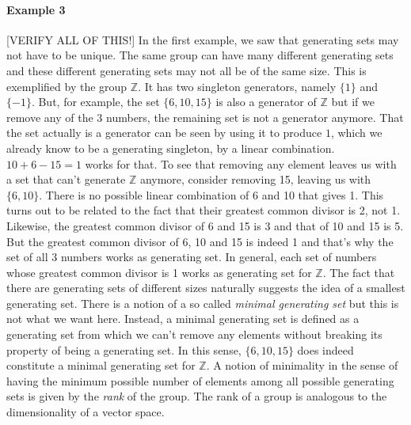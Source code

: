 \paragraph{Example 3} [VERIFY ALL OF THIS!] In the first example, we saw that generating sets may not have to be unique. The same group can have many different generating sets and these different generating sets may not all be of the same size. This is exemplified by the group $\mathbb{Z}$. It has two singleton generators, namely $\{1\}$ and $\{-1\}$. But, for example, the set $\{6,10,15\}$ is also a generator of $\mathbb{Z}$ but if we remove any of the 3 numbers, the remaining set is not a generator anymore. That the set actually is a generator can be seen by using it to produce $1$, which we already know to be a generating singleton, by a linear combination. $10 + 6 - 15 = 1$ works for that. To see that removing any element leaves us with a set that can't generate  $\mathbb{Z}$ anymore, consider removing 15, leaving us with $\{6,10\}$. There is no possible linear combination of 6 and 10 that gives 1. This turns out to be related to the fact that their greatest common divisor is 2, not 1. Likewise, the greatest common divisor of 6 and 15 is 3 and that of 10 and 15 is 5. But the greatest common divisor of 6, 10 and 15 is indeed 1 and that's why the set of all 3 numbers works as generating set. In general, each set of numbers whose greatest common divisor is 1 works as generating set for $\mathbb{Z}$. The fact that there are generating sets of different sizes naturally suggests the idea of a smallest generating set. There is a notion of a so called \emph{minimal generating set} but this is not what we want here. Instead, a minimal generating set is defined as a generating set from which we can't remove any elements without breaking its property of being a generating set. In this sense, $\{6,10,15\}$ does indeed constitute a minimal generating set for $\mathbb{Z}$. A notion of minimality in the sense of having the minimum possible number of elements among all possible generating sets is given by the \emph{rank} of the group. The rank of a group is analogous to the dimensionality of a vector space. 



